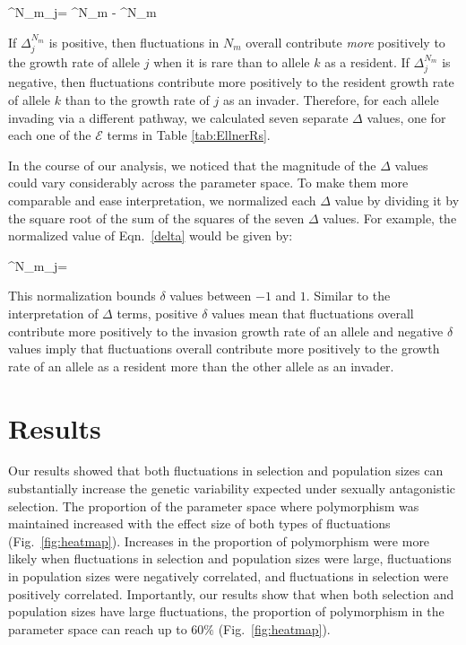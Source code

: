 \documentclass[12pt]{article}
\let\oldequation\equation
\let\oldendequation\endequation
\renewenvironment{equation}
  {\linenomathNonumbers\oldequation}
  {\oldendequation\endlinenomath}
\begin{document}
\begin{equation}
\Delta^{N_{m}}_{j}= ^{N_{m}} - ^{N_{m}}
\label{delta}
\end{equation}

If $\Delta^{N_{m}}_{j}$ is positive, then fluctuations in $N_{m}$ overall contribute \textit{more} positively to the growth rate of allele $j$ when it is rare than to allele $k$ as a resident. If $\Delta^{N_{m}}_{j}$ is negative, then fluctuations contribute more positively to the resident growth rate of allele $k$ than to the growth rate of $j$ as an invader. Therefore, for each allele invading via a different pathway, we calculated seven separate $\Delta$ values, one for each one of the $\mathcal{E}$ terms in Table \ref{tab:EllnerRs}.


In the course of our analysis, we noticed that the magnitude of the $\Delta$ values could vary considerably across the parameter space. To make them more comparable and ease interpretation, we normalized each $\Delta$ value by dividing it by the square root of the sum of the squares of the seven $\Delta$ values. For example, the normalized value of Eqn.~\ref{delta} would be given by:



\begin{equation}
  \delta^{N_{m}}_{j}= 
\end{equation}

This normalization bounds $\delta$ values between $-1$ and $1$. Similar to the interpretation of $\Delta$ terms, positive $\delta$ values mean that fluctuations overall contribute more positively to the invasion growth rate of an allele and negative $\delta$ values imply that fluctuations overall contribute more positively to the growth rate of an allele as a resident more than the other allele as an invader.


\section{Results}
Our results showed that both fluctuations in selection and population sizes can substantially increase the  genetic variability expected under sexually antagonistic selection. The proportion of the parameter space where polymorphism was maintained increased with the effect size of both types of fluctuations (Fig.~\ref{fig:heatmap}). Increases in the proportion of polymorphism were more likely when fluctuations in selection and population sizes were large, fluctuations in population sizes were negatively correlated, and fluctuations in selection were positively correlated. Importantly, our results show that when both selection and population sizes have large fluctuations, the proportion of polymorphism in the parameter space can reach up to $60\% $ (Fig.~\ref{fig:heatmap}).
\end{document}
